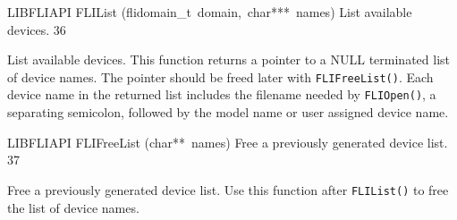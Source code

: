 \documentclass{article}
\begin{document}
\begin{cxxfunction}
{LIBFLIAPI}
        {FLIList}
        {(flidomain\_t\ domain,\ char***\ names)}
        {
 List available devices.}
        {36}
\begin{cxxdoc}

List available devices.  This function returns a pointer to a NULL
terminated list of device names.  The pointer should be freed later
with \texttt{FLIFreeList()}.  Each device name in the returned list
includes the filename needed by \texttt{FLIOpen()}, a separating
semicolon, followed by the model name or user assigned device name.


\end{cxxdoc}
\end{cxxfunction}
\begin{cxxfunction}
{LIBFLIAPI}
        {FLIFreeList}
        {(char**\ names)}
        {
 Free a previously generated device list.}
        {37}
\begin{cxxdoc}

Free a previously generated device list.  Use this function after
\texttt{FLIList()} to free the list of device names.


\end{cxxdoc}
\end{cxxfunction}
\end{document}
